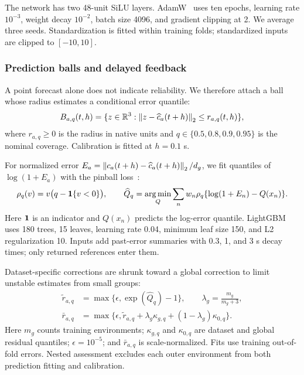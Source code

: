 The network has two 48-unit SiLU layers. AdamW~\cite{adamw} uses ten epochs, learning rate $10^{-3}$, weight decay $10^{-2}$, batch size 4096, and gradient clipping at 2. We average three seeds. Standardization is fitted within training folds; standardized inputs are clipped to $[-10,10]$.

\subsubsection{Prediction balls and delayed feedback}
A point forecast alone does not indicate reliability. We therefore attach a ball whose radius estimates a conditional error quantile:
\begin{equation}
B_{a,q}(t,h)=\{z\in\mathbb{R}^3:\left\lVert z-\widehat c_a(t+h)\right\rVert_2\leq r_{a,q}(t,h)\},
\label{eq:ball}
\end{equation}
\noindent where $r_{a,q}\geq0$ is the radius in native units and $q\in\{0.5,0.8,0.9,0.95\}$ is the nominal coverage. Calibration is fitted at $h=0.1$ s.

For normalized error $E_a=\left\lVert c_a(t+h)-\widehat c_a(t+h)\right\rVert_2/d_g$, we fit quantiles of $\log(1+E_a)$ with the pinball loss~\cite{quantiles}:
\begin{equation}
\rho_q(v)=v\bigl(q-\mathbf{1}\{v<0\}\bigr),\qquad
\widehat Q_q=\operatorname*{arg\,min}_Q\sum_n w_n\rho_q\{\log(1+E_n)-Q(x_n)\}.
\label{eq:pinball}
\end{equation}
\noindent Here $\mathbf{1}$ is an indicator and $Q(x_n)$ predicts the log-error quantile. LightGBM~\cite{lightgbm} uses 180 trees, 15 leaves, learning rate 0.04, minimum leaf size 150, and L2 regularization 10. Inputs add past-error summaries with 0.3, 1, and 3 s decay times; only returned references enter them.

Dataset-specific corrections are shrunk toward a global correction to limit unstable estimates from small groups:
\begin{equation}
\begin{aligned}
\widetilde r_{a,q}&=\max\{\epsilon,\exp(\widehat Q_q)-1\},\qquad
\lambda_g=\frac{m_g}{m_g+3},\\
\bar r_{a,q}&=\max\{\epsilon,\widetilde r_{a,q}
+\lambda_g\kappa_{g,q}+(1-\lambda_g)\kappa_{0,q}\}.
\end{aligned}
\label{eq:pool}
\end{equation}
\noindent Here $m_g$ counts training environments; $\kappa_{g,q}$ and $\kappa_{0,q}$ are dataset and global residual quantiles; $\epsilon=10^{-5}$; and $\bar r_{a,q}$ is scale-normalized. Fits use training out-of-fold errors. Nested assessment excludes each outer environment from both prediction fitting and calibration.

